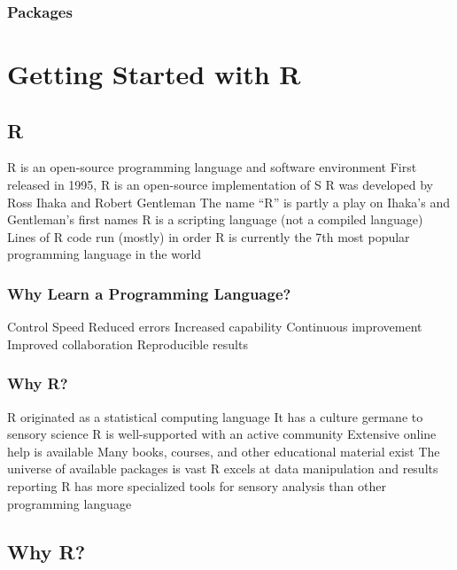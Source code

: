 \documentclass[
]{book}
\begin{document}
\hypertarget{packages}{%
\subsection{Packages}\label{packages}}

\hypertarget{start-R}{%
\chapter{Getting Started with R}\label{start-R}}

\hypertarget{r}{%
\section{R}\label{r}}

R is an open-source programming language and software environment
First released in 1995, R is an open-source implementation of S
R was developed by Ross Ihaka and Robert Gentleman
The name ``R'' is partly a play on Ihaka's and Gentleman's first names
R is a scripting language (not a compiled language)
Lines of R code run (mostly) in order
R is currently the 7th most popular programming language in the world

\hypertarget{why-learn-a-programming-language}{%
\subsection{Why Learn a Programming Language?}\label{why-learn-a-programming-language}}

Control
Speed
Reduced errors
Increased capability
Continuous improvement
Improved collaboration
Reproducible results

\hypertarget{why-r}{%
\subsection{Why R?}\label{why-r}}

R originated as a statistical computing language
It has a culture germane to sensory science
R is well-supported with an active community
Extensive online help is available
Many books, courses, and other educational material exist
The universe of available packages is vast
R excels at data manipulation and results reporting
R has more specialized tools for sensory analysis than other programming language

\hypertarget{why-r-1}{%
\section{Why R?}\label{why-r-1}}
\end{document}
